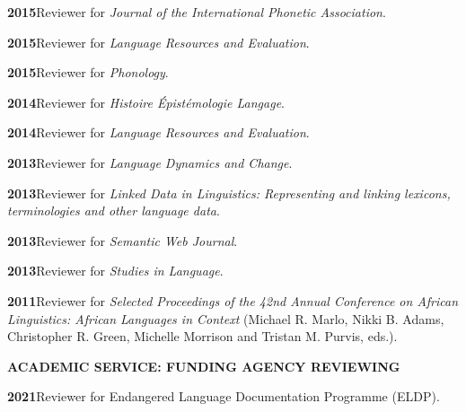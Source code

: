 \documentclass[11pt]{article}
\newcommand{\hangpara}{
 \setlength{\parindent}{0in} %
 \hangindent=0.42in %
}
\begin{document}
\vskip 6pt
\hangpara
{\bf 2015}\hspace{1ex}Reviewer for \textit{Journal of the International Phonetic Association}.


\vskip 6pt
\hangpara
{\bf 2015}\hspace{1ex}Reviewer for \textit{Language Resources and Evaluation}.

\vskip 6pt
\hangpara
{\bf 2015}\hspace{1ex}Reviewer for \textit{Phonology}.

\vskip 6pt
\hangpara
{\bf 2014}\hspace{1ex}Reviewer for \textit{Histoire {\'E}pist{\'e}mologie Langage}.

\vskip 6pt
\hangpara
{\bf 2014}\hspace{1ex}Reviewer for \textit{Language Resources and Evaluation}.

\vskip 6pt
\hangpara
{\bf 2013}\hspace{1ex}Reviewer for \textit{Language Dynamics and Change}.

\vskip 6pt
\hangpara
{\bf 2013}\hspace{1ex}Reviewer for \textit{Linked Data in Linguistics: Representing and linking lexicons, terminologies and other language data}.

\vskip 6pt
\hangpara
{\bf 2013}\hspace{1ex}Reviewer for \textit{Semantic Web Journal}.

\vskip 6pt
\hangpara
{\bf 2013}\hspace{1ex}Reviewer for \textit{Studies in Language}.

\vskip 6pt
\hangpara
{\bf 2011}\hspace{1ex}Reviewer for \textit{Selected Proceedings of the 42nd Annual Conference on African Linguistics: African Languages in Context} (Michael R. Marlo, Nikki B. Adams, Christopher R. Green, Michelle Morrison and Tristan M. Purvis, eds.).


\vskip 20pt
\begin{flushleft}
{\bf ACADEMIC SERVICE: FUNDING AGENCY REVIEWING}
\end{flushleft}

\hangpara
{\bf 2021}\hspace{1ex}Reviewer for Endangered Language Documentation Programme (ELDP).
\end{document}

